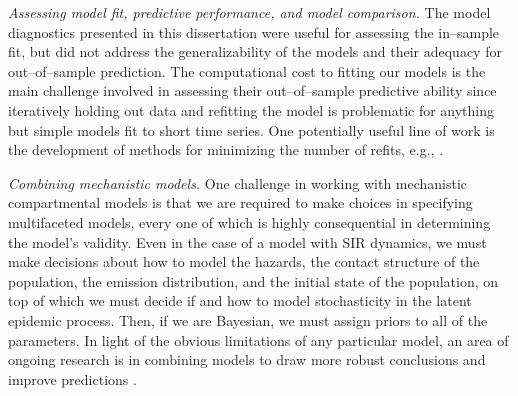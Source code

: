 \textit{Assessing model fit, predictive performance, and model comparison.} The model diagnostics presented in this dissertation were useful for assessing the in--sample fit, but did not address the generalizability of the models and their adequacy for out--of--sample prediction. The computational cost to fitting our models is the main challenge involved in assessing their out--of--sample predictive ability since iteratively holding out data and refitting the model is problematic for anything but simple models fit to short time series. One potentially useful line of work is the development of methods for minimizing the number of refits, e.g., \cite{buerkner2018psis}. 

\textit{Combining mechanistic models.} One challenge in working with mechanistic compartmental models is that we are required to make choices in specifying multifaceted models, every one of which is highly consequential in determining the model's validity. Even in the case of a model with SIR dynamics, we must make decisions about how to model the hazards, the contact structure of the population, the emission distribution, and the initial state of the population, on top of which we must decide if and how to model stochasticity in the latent epidemic process. Then, if we are Bayesian, we must assign priors to all of the parameters. In light of the obvious limitations of any particular model, an area of ongoing research is in combining models to draw more robust conclusions and improve predictions \cite{ray2018prediction,reich2018forecasting,yao2017using}.
